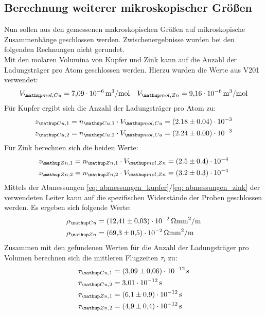 \subsection{Berechnung weiterer mikroskopischer Größen}
Nun sollen aus den gemessenen makroskopischen Größen auf mikroskopische Zusammenhänge geschlossen werden. Zwischenergebnisse
wurden bei den folgenden Rechnungen nicht gerundet. \\
Mit den molaren Volumina von Kupfer und Zink kann auf die Anzahl der Ladungsträger pro Atom
geschlossen werden. Hierzu wurden die Werte aus V201 \cite{anleitung201} verwendet:
\begin{equation}
  V\ua{mol, Cu} = \SI{7.09e-6}{m^3 /mol} \quad   V\ua{mol, Zn} = \SI{9.16e-6}{m^3 /mol}%
\end{equation}
Für Kupfer ergibt sich die Anzahl der Ladungsträger pro Atom zu:
\begin{align}
  \begin{aligned}
    z\ua{Cu,1} &= n\ua{Cu,1} \cdot V\ua{mol, Cu} =  (2.18 \pm 0.04) \cdot 10^{-3}  \\
    z\ua{Cu,2} &= n\ua{Cu,2} \cdot V\ua{mol, Cu} =  (2.24 \pm 0.00) \cdot 10^{-3}
  \end{aligned}
\end{align}
Für Zink berechnen sich die beiden Werte:
\begin{align}
  \begin{aligned}
    z\ua{Zn,1} &= n\ua{Zn,1} \cdot V\ua{mol, Zn} =  (2.5\pm 0.4)\cdot 10^{-4}\\
    z\ua{Zn,2} &= n\ua{Zn,2} \cdot V\ua{mol, Zn} =   (3.2\pm 0.3)\cdot 10^{-4}
  \end{aligned}
\end{align}
Mittels der Abmessungen \eqref{eq: abmessungen_kupfer}/\eqref{eq: abmessungen_zink} der verwendeten Leiter kann auf die spezifischen Widerstände der Proben geschlossen werden. Es ergeben sich folgende Werte:
\begin{align}
  \begin{aligned}
    \rho\ua{Cu} &=  \SI{12.41(3)e-2}{\ohm \milli \meter^2 \per \meter} \\%
    \rho\ua{Zn} &=  \SI{69.3(5)e-2}{\ohm \milli \meter^2 \per \meter}
    \label{eq: res_spez_widerstand}
  \end{aligned}
\end{align}
Zusammen mit den gefundenen Werten für die Anzahl der Ladungsträger pro Volumen berechnen sich die mittleren Flugzeiten $\tau_i$ zu:
\begin{align}
  \begin{aligned}
    \tau\ua{Cu,1} &= \SI{3.09(6)e-12}{\second} \\%
    \tau\ua{Cu,2} &= \SI{3.01(0)e-12}{\second} \\
    \tau\ua{Zn,1} &= \SI{6.1(9)e-12}{\second} \\
    \tau\ua{Zn,2} &= \SI{4.9(4)e-12}{\second}
  \end{aligned}
\end{align}
